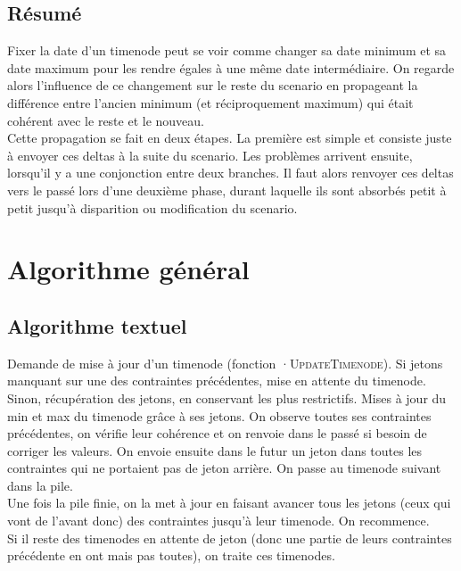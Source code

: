 \documentclass[10pt,a4paper]{article}
\begin{document}
	\subsection{Résumé}

Fixer la date d'un timenode peut se voir comme changer sa date minimum et sa date maximum pour les rendre égales à une même date intermédiaire. On regarde alors l'influence de ce changement sur le reste du scenario en propageant la différence entre l'ancien minimum (et réciproquement maximum) qui était cohérent avec le reste et le nouveau. \\

Cette propagation se fait en deux étapes. La première est simple et consiste juste à envoyer ces deltas à la suite du scenario. Les problèmes arrivent ensuite, lorsqu'il y a une conjonction entre deux branches. Il faut alors renvoyer ces deltas vers le passé lors d'une deuxième phase, durant laquelle ils sont absorbés petit à petit jusqu'à disparition ou modification du scenario.

\section{Algorithme général}
	\subsection{Algorithme textuel}

Demande de mise à jour d'un timenode (fonction ·\textsc{UpdateTimenode}). Si jetons manquant sur une des contraintes précédentes, mise en attente du timenode. Sinon, récupération des jetons, en conservant les plus restrictifs. Mises à jour du min et max du timenode grâce à ses jetons. On observe toutes ses contraintes précédentes, on vérifie leur cohérence et on renvoie dans le passé si besoin de corriger les valeurs. On envoie ensuite dans le futur un jeton dans toutes les contraintes qui ne portaient pas de jeton arrière. On passe au timenode suivant dans la pile. \\

Une fois la pile finie, on la met à jour en faisant avancer tous les jetons (ceux qui vont de l'avant donc) des contraintes jusqu'à leur timenode. On recommence. \\

Si il reste des timenodes en attente de jeton (donc une partie de leurs contraintes précédente en ont mais pas toutes), on traite ces timenodes.\\
\end{document}
